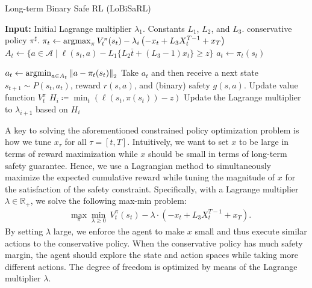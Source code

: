 \documentclass[letterpaper]{article} %
\newcommand{\argmin}{\mathop{\rm argmin}}
\newcommand{\argmax}{\mathop{\rm argmax}}
\newcommand{\R}{\mathbb{R}}
\newcommand{\cA}{\mathcal{A}}
\newcommand{\norm}[1]{\left\|{#1}\right\|_2}
\newcommand{\algo}{\textsf{LoBiSaRL}}
\begin{document}
\begin{algorithm}[t]
    \caption{Long-term Binary Safe RL (\algo)}
    \label{alg:algorithm}
    \begin{algorithmic}[1]
    \begin{small}
        \STATE \textbf{Input:} Initial Lagrange multiplier $\lambda_1$. Constants $L_1$, $L_2$, and $L_3$. conservative policy $\pi^\sharp$.
                \STATE $\pi_t \leftarrow \argmax_\pi V_t^\pi(s_t) - \lambda_i \left(-x_t + L_3 X_{t}^{T-1} + x_{T}\right)$
                \STATE $A_t \leftarrow \{a \in \!\cA \mid \ell(s_t, a) - L_1 \{L_2 \bar{t} + (L_3 -1) x_t \} \ge z \}$
                    \STATE $a_t \leftarrow \pi_t(s_t)$
                \ELSE
                    
                    \STATE $a_t \leftarrow \argmin_{a \in A_t} \norm{a - \pi_t(s_t)}$
                \ENDIF
                \STATE Take $a_t$ and then receive a next state $s_{t+1} \sim P(s_t, a_t)$, reward $r(s,a)$, and (binary) safety $g(s,a)$.
                \STATE Update value function $V_t^\pi$
            \ENDFOR
            \STATE $H_i \coloneqq \min_t \left(\ell(s_t, \pi(s_t)) - z \right)$
            \STATE Update the Lagrange multiplier to $\lambda_{i+1}$ based on $H_i$
        \ENDFOR
    \end{small}
    \end{algorithmic}
\end{algorithm}

A key to solving the aforementioned constrained policy optimization problem is how we tune $x_\tau$ for all $\tau = [t, T]$.
Intuitively, we want to set $x$ to be large in terms of reward maximization while $x$ should be small in terms of long-term safety guarantee.
Hence, we use a Lagrangian method to simultaneously maximize the expected cumulative reward while tuning the magnitude of $x$ for the satisfaction of the safety constraint.
Specifically, with a Lagrange multiplier $\lambda \in \R_+$, we solve the following max-min problem:
%
\begin{align}
    &\max_\pi \min_{\lambda \ge 0} \ V_t^\pi(s_t) - \lambda \cdot (-x_t + L_3 X_{t}^{T-1} + x_{T}).
\end{align}
%
By setting $\lambda$ large, we enforce the agent to make $x$ small and thus execute similar actions to the conservative policy.
When the conservative policy has much safety margin, the agent should explore the state and action spaces while taking more different actions.
The degree of freedom is optimized by means of the Lagrange multiplier $\lambda$.
\end{document}
